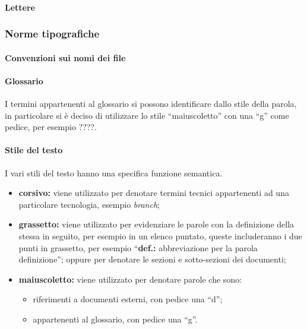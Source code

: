 			\paragraph{Lettere}

		\subsubsection{Norme tipografiche}
			\paragraph{Convenzioni sui nomi dei file}
			\paragraph{Glossario}
				I termini appartenenti al glossario si possono identificare dallo stile della parola, in particolare si è deciso di utilizzare lo stile ``maiuscoletto'' con una ``g'' come pedice, per esempio ????.
			\paragraph{Stile del testo}
				I vari stili del testo hanno una specifica funzione semantica.
				\begin{itemize}
					\item \textbf{corsivo:} viene utilizzato per denotare termini tecnici appartenenti ad una particolare tecnologia, esempio \textit{branch};
					\item \textbf{grassetto:} viene utilizzato per evidenziare le parole con la definizione della stessa in seguito, per esempio in un elenco puntato, queste includeranno i due punti in grassetto, per esempio ``\textbf{def.:} abbreviazione per la parola definizione''; oppure per denotare le sezioni e sotto-sezioni dei documenti;
					\item \textbf{maiuscoletto:} viene utilizzato per denotare parole che sono:
						\begin{itemize}
							\item riferimenti a documenti esterni, con pedice una ``d'';
							\item appartenenti al glossario, con pedice una ``g''.
						\end{itemize}
				\end{itemize}
